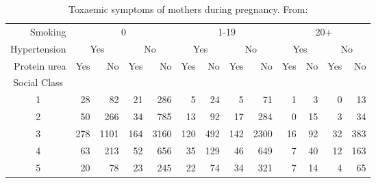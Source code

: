 \begin{table}[htb]
 \caption{Toxaemic symptoms of mothers during pregnancy. From: }\label{tab:toxtab}
 \begin{center}
 \begin{tabular}{c| rrrr| rrrr| rrrr}
  \hline
\multicolumn{1}{r|}{Smoking}
    & \multicolumn{4}{c|}{0} & \multicolumn{4}{c|}{1-19} & \multicolumn{4}{c}{20+} \\

\multicolumn{1}{r|}{Hypertension}
    & \multicolumn{2}{c}{Yes} & \multicolumn{2}{c|}{No} & \multicolumn{2}{c}{Yes} & \multicolumn{2}{c|}{No}  & \multicolumn{2}{c}{Yes} & \multicolumn{2}{c}{No} \\
\multicolumn{1}{r|}{Protein urea}
    & Yes & No & Yes & No & Yes & No & Yes & No & Yes & No & Yes & No \\ 
  \hline
Social Class \\
  \hline
  1 &  28 &   82 &  21 &  286 &   5 &  24 &   5 &   71 &  1 &  3 &  0 & 13 \\ 
  2 &  50 &  266 &  34 &  785 &  13 &  92 &  17 &  284 &  0 & 15 &  3 & 34 \\ 
  3 & 278 & 1101 & 164 & 3160 & 120 & 492 & 142 & 2300 & 16 & 92 & 32 & 383 \\ 
  4 &  63 &  213 &  52 &  656 &  35 & 129 &  46 &  649 &  7 & 40 & 12 & 163 \\ 
  5 &  20 &   78 &  23 &  245 &  22 &  74 &  34 &  321 &  7 & 14 &  4 & 65 \\ 
  \hline
 \end{tabular}
 \end{center}
\end{table}
